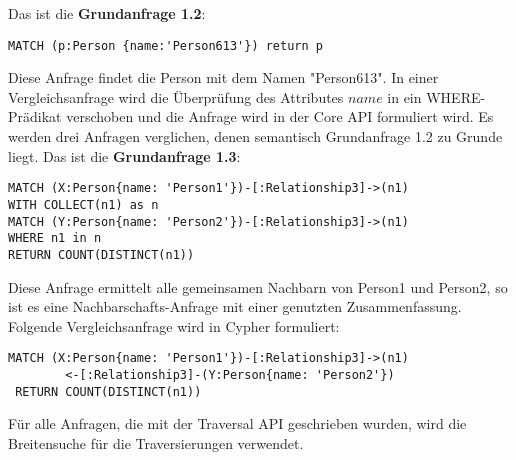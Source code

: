 \noindent Das ist die \textbf{Grundanfrage 1.2}: 
\begin{Verbatim}[frame=single]
MATCH (p:Person {name:'Person613'}) return p
\end{Verbatim} 
Diese Anfrage findet die Person mit dem Namen "Person613". In einer Vergleichsanfrage wird die Überprüfung des Attributes $name$ in ein WHERE-Prädikat verschoben und die Anfrage wird in der Core API formuliert wird. Es werden drei Anfragen verglichen, denen semantisch Grundanfrage 1.2 zu Grunde liegt.\newline \newline
Das ist die \textbf{Grundanfrage 1.3}: 
\begin{Verbatim}[frame=single]
MATCH (X:Person{name: 'Person1'})-[:Relationship3]->(n1) 
WITH COLLECT(n1) as n 
MATCH (Y:Person{name: 'Person2'})-[:Relationship3]->(n1) 
WHERE n1 in n
RETURN COUNT(DISTINCT(n1))
\end{Verbatim} 
Diese Anfrage ermittelt alle gemeinsamen Nachbarn von Person1 und Person2, so ist es eine Nachbarschafts-Anfrage mit einer genutzten Zusammenfassung. Folgende Vergleichsanfrage wird  in Cypher formuliert:
\begin{Verbatim}[frame=single]
 MATCH (X:Person{name: 'Person1'})-[:Relationship3]->(n1)
 		<-[:Relationship3]-(Y:Person{name: 'Person2'}) 
 RETURN COUNT(DISTINCT(n1))
\end{Verbatim} 
Für alle Anfragen, die mit der Traversal API geschrieben wurden, wird die Breitensuche für die Traversierungen verwendet. 
